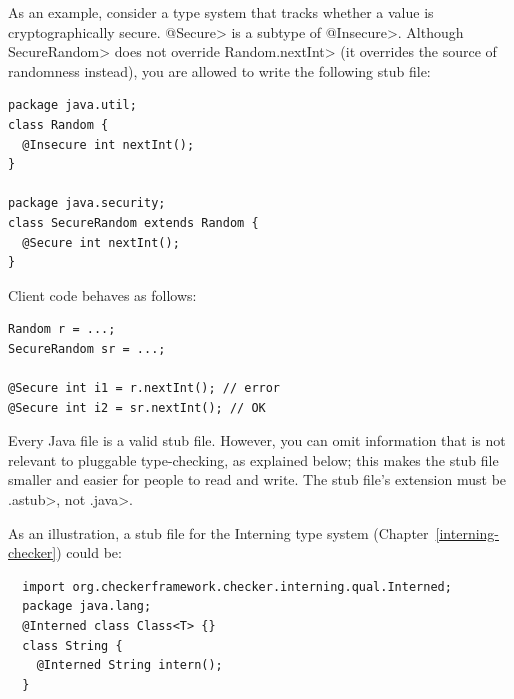 As an example, consider a type system that tracks whether a value is
cryptographically secure.  \<@Secure> is a subtype of \<@Insecure>.
Although \<SecureRandom> does not override \<Random.nextInt> (it overrides
the source of randomness instead), you are allowed to write the following
stub file:

\begin{Verbatim}
package java.util;
class Random {
  @Insecure int nextInt();
}

package java.security;
class SecureRandom extends Random {
  @Secure int nextInt();
}
\end{Verbatim}

Client code behaves as follows:

\begin{Verbatim}
Random r = ...;
SecureRandom sr = ...;

@Secure int i1 = r.nextInt(); // error
@Secure int i2 = sr.nextInt(); // OK
\end{Verbatim}



Every Java file is a valid stub file.  However, you can omit information
that is not relevant to pluggable type-checking, as explained below;
this makes the stub file
smaller and easier for people to read and write.
The stub file's extension must be \<.astub>, not \<.java>.

As an illustration, a stub file for the Interning type system
(Chapter~\ref{interning-checker}) could be:

\begin{Verbatim}
  import org.checkerframework.checker.interning.qual.Interned;
  package java.lang;
  @Interned class Class<T> {}
  class String {
    @Interned String intern();
  }
\end{Verbatim}

